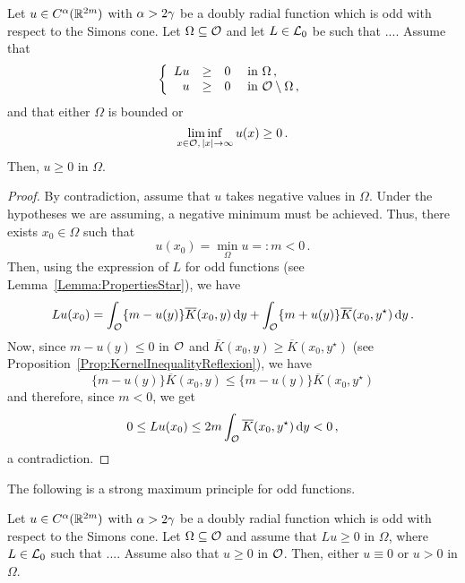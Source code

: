 \begin{proposition}
	\label{Prop:WeakMaximumPrincipleForOddFunctionsRotations}
	Let $u\in C^{\alpha}(\mathbb{R}^{2m})$ with $\alpha > 2\gamma$ be a doubly radial function which is odd with respect to the Simons cone. Let $\Omega \subseteq \mathcal{O}$ and let $L \in \mathcal{L}_0$ be such that .... Assume that
	$$
	\left\{\begin{array}{rcll}
	Lu & \geq & 0 & \text{ in } \Omega\,,\\
	u & \geq & 0 & \text{ in } \mathcal{O} \setminus \Omega\,,
	\end{array} \right.
	$$
    and that either $\Omega$ is bounded or 
    $$
    \liminf_{x \in \mathcal{O},\,|x|\to \infty} u(x) \geq 0\,.
    $$
	Then, $u \geq 0$ in $\Omega$. 
\end{proposition}

\begin{proof}
	By contradiction, assume that $u$ takes negative values in $\Omega$. Under the hypotheses we are assuming, a negative minimum must be achieved. Thus, there exists $x_0\in \Omega$ such that
	$$
	u(x_0) = \min_{\Omega} u =: m < 0\,.
	$$
	Then, using the expression of $L$ for odd functions (see Lemma~\ref{Lemma:PropertiesStar}), we have
	$$
	Lu (x_0) = \int_{\mathcal{O}} \{m - u(y) \} \overline{K}(x_0, y) \,\mathrm{d} y +  \int_{\mathcal{O}} \{m + u(y) \} \overline{K}(x_0, y^\star) \,\mathrm{d} y\,.
	$$
	Now, since $m - u(y) \leq 0$ in $\mathcal{O}$ and $\overline{K}(x_0, y) \geq \overline{K}(x_0, y^\star)$ (see Proposition~\ref{Prop:KernelInequalityReflexion}), we have
	$$
	\{m - u(y) \} \overline{K}(x_0, y) \leq \{m - u(y) \} \overline{K}(x_0, y^\star)
	$$
	and therefore, since $m<0$, we get
	$$
	0 \leq L u(x_0) \leq 2m \int_{\mathcal{O}} \overline{K}(x_0, y^\star) \,\mathrm{d} y < 0\,,
	$$
	a contradiction.
\end{proof}

The following is a strong maximum principle for odd functions.

\begin{proposition}
	\label{Prop:StrongMaximumPrincipleForOddFunctionsRotations}
	Let $u\in C^{\alpha}(\mathbb{R}^{2m})$ with $\alpha > 2\gamma$ be a doubly radial function which is odd with respect to the Simons cone.  Let $\Omega \subseteq \mathcal{O}$ and assume that $Lu \geq 0$ in $\Omega$, where $L \in \mathcal{L}_0$ such that .... Assume also that $u\geq 0$ in $\mathcal{O}$. Then, either $u\equiv 0$ or $u > 0$ in $\Omega$.
\end{proposition}

